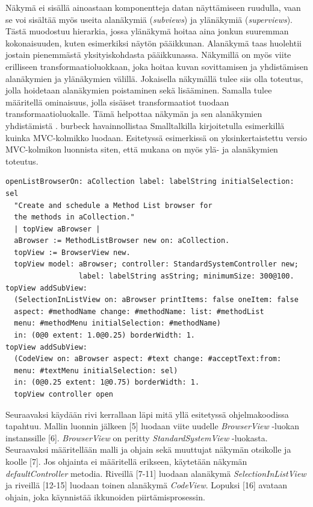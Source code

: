 \documentclass[utf8]{gradu3}
\begin{document}
Näkymä ei sisällä ainoastaan komponentteja datan näyttämiseen ruudulla, vaan se voi sisältää myös useita alanäkymiä (\emph{subviews}) ja ylänäkymiä (\emph{superviews}). Tästä muodostuu hierarkia, jossa ylänäkymä hoitaa aina jonkun suuremman kokonaisuuden, kuten esimerkiksi näytön pääikkunan. Alanäkymä taas huolehtii jostain pienemmästä yksityiskohdasta pääikkunassa. Näkymillä on myös viite erilliseen transformaatioluokkaan, joka hoitaa kuvan sovittamisen ja yhdistämisen alanäkymien ja ylänäkymien välillä. Jokaisella näkymällä tulee siis olla toteutus, jolla hoidetaan alanäkymien poistaminen sekä lisääminen. Samalla tulee määritellä ominaisuus, jolla sisäiset transformaatiot tuodaan transformaatioluokalle. Tämä helpottaa näkymän ja sen alanäkymien yhdistämistä \parencite[s. 8]{krasner_desc}. burbeck havainnollistaa Smalltalkilla kirjoitetulla esimerkillä kuinka MVC-kolmikko luodaan. Esitetyssä esimerkissä on yksinkertaistettu versio MVC-kolmikon luonnista siten, että mukana on myös ylä- ja alanäkymien toteutus.

\begin{lstlisting}[language=Smalltalk]
openListBrowserOn: aCollection label: labelString initialSelection: sel
  "Create and schedule a Method List browser for 
  the methods in aCollection."
  | topView aBrowser | 
  aBrowser := MethodListBrowser new on: aCollection.
  topView := BrowserView new.
  topView model: aBrowser; controller: StandardSystemController new;
                 label: labelString asString; minimumSize: 300@100.
topView addSubView:
  (SelectionInListView on: aBrowser printItems: false oneItem: false
  aspect: #methodName change: #methodName: list: #methodList
  menu: #methodMenu initialSelection: #methodName)
  in: (0@0 extent: 1.0@0.25) borderWidth: 1.
topView addSubView:
  (CodeView on: aBrowser aspect: #text change: #acceptText:from:
  menu: #textMenu initialSelection: sel)
  in: (0@0.25 extent: 1@0.75) borderWidth: 1.
  topView controller open
\end{lstlisting}

Seuraavaksi käydään rivi kerrallaan läpi mitä yllä esitetyssä ohjelmakoodissa tapahtuu. Mallin luonnin jälkeen [5] luodaan viite uudelle \textit{BrowserView} -luokan instanssille [6]. \textit{BrowserView} on peritty \textit{StandardSystemView} -luokasta. Seuraavaksi määritellään malli ja ohjain sekä muuttujat näkymän otsikolle ja koolle [7]. Jos ohjainta ei määritellä erikseen, käytetään näkymän \textit{defaultController} metodia. Riveillä [7-11] luodaan alanäkymä \textit{SelectionInListView} ja riveillä [12-15] luodaan toinen alanäkymä \textit{CodeView}. Lopuksi [16] avataan ohjain, joka käynnistää ikkunoiden piirtämisprosessin.
\end{document}
